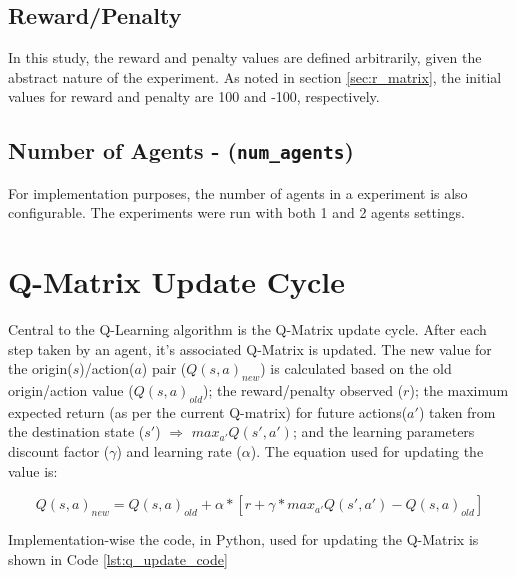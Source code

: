 \documentclass[10pt]{article}
\begin{document}
    \subsection{Reward/Penalty}
        In this study, the reward and penalty values are defined arbitrarily, given the abstract nature of the experiment. As noted in section \ref{sec:r_matrix}, the initial values for reward and penalty are 100 and -100, respectively.

    \subsection{Number of Agents - (\texttt{num\_agents})}
        For implementation purposes, the number of agents in a experiment is also configurable. The experiments were run with both 1 and 2 agents settings.

\section{Q-Matrix Update Cycle}
    Central to the Q-Learning algorithm is the Q-Matrix update cycle. After each step taken by an agent, it's associated Q-Matrix is updated. The new value for the origin($s$)/action($a$) pair ($Q(s,a)_{new}$) is calculated based on the old origin/action value ($Q(s,a)_{old}$); the reward/penalty observed ($r$); the maximum expected return (as per the current Q-matrix) for future actions($a'$) taken from the destination state ($s'$) $\Rightarrow$ $max_{a'} Q(s',a')$; and the learning parameters discount factor ($\gamma$) and learning rate ($\alpha$). The equation used for updating the value is:

    \begin{equation}\label{eq:q_update}
        Q(s,a)_{new} = Q(s,a)_{old} + \alpha*[r+\gamma*max_{a'} Q(s',a') - Q(s,a)_{old}]
    \end{equation}

    Implementation-wise the code, in Python, used for updating the Q-Matrix is shown in Code \ref{lst:q_update_code}
\end{document}
